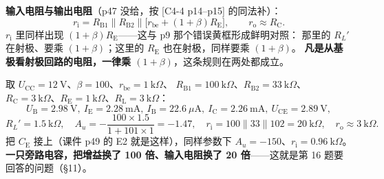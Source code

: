 \documentclass[11pt]{ctexart}
\begin{document}

\textbf{输入电阻与输出电阻}（p47 没给，按 [C4-4 p14--p15] 的同法补）：
\[
r_{\mathrm{i}}=R_{\mathrm{B1}}\parallel R_{\mathrm{B2}}\parallel\bigl[r_{\mathrm{be}}+(1+\beta)R_{\mathrm{E}}\bigr],
\qquad r_{\mathrm{o}}\approx R_{\mathrm{C}} .
\]
$r_{\mathrm{i}}$ 里同样出现 $(1+\beta)R_{\mathrm{E}}$——这与 p9 那个错误黄框形成鲜明对照：
那里的 $R_L'$ 在射极、要乘 $(1+\beta)$；这里的 $R_{\mathrm{E}}$ 也在射极，同样要乘 $(1+\beta)$。
\textbf{凡是从基极看射极回路的电阻，一律乘 $(1+\beta)$}，这条规则在两处都成立。


取 $U_{\mathrm{CC}}=12\ \mathrm{V}$、$\beta=100$、$r_{\mathrm{be}}=1\ \mathrm{k}\Omega$、
$R_{\mathrm{B1}}=100\ \mathrm{k}\Omega$、$R_{\mathrm{B2}}=33\ \mathrm{k}\Omega$、
$R_{\mathrm{C}}=3\ \mathrm{k}\Omega$、$R_{\mathrm{E}}=1\ \mathrm{k}\Omega$、$R_{\mathrm{L}}=3\ \mathrm{k}\Omega$：
\[
U_{\mathrm{B}}=2.98\ \mathrm{V},\ I_{\mathrm{E}}=2.28\ \mathrm{mA},\ I_{\mathrm{B}}=22.6\ \mu\mathrm{A},\
I_{\mathrm{C}}=2.26\ \mathrm{mA},\ U_{\mathrm{CE}}=2.89\ \mathrm{V},
\]
\[
R_L'=1.5\ \mathrm{k}\Omega,\quad
A_u=-\frac{100\times1.5}{1+101\times1}=-1.47,\quad
r_{\mathrm{i}}=100\parallel33\parallel102=20\ \mathrm{k}\Omega,\quad
r_{\mathrm{o}}\approx3\ \mathrm{k}\Omega .
\]
把 $C_{\mathrm{E}}$ 接上（课件 p49 的 E2 就是这样），同样参数下 $A_u=-150$、$r_{\mathrm{i}}=0.96\ \mathrm{k}\Omega$。
\textbf{一只旁路电容，把增益换了 100 倍、输入电阻换了 20 倍}——这就是第 16 题要回答的问题（§11）。

\end{document}

